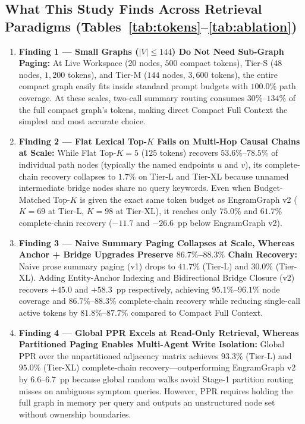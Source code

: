 \documentclass[10pt]{article}
\begin{document}
\subsection{What This Study Finds Across Retrieval Paradigms (Tables~\ref{tab:tokens}--\ref{tab:ablation})}
\begin{enumerate}
  \setlength{\itemsep}{2pt}\setlength{\parskip}{0pt}
  \item \textbf{Finding 1 --- Small Graphs ($|V| \le 144$) Do Not Need Sub-Graph Paging:} At Live Workspace ($20$ nodes, $500$ compact tokens), Tier-S ($48$ nodes, $1,200$ tokens), and Tier-M ($144$ nodes, $3,600$ tokens), the entire compact graph easily fits inside standard prompt budgets with $100.0\%$ path coverage. At these scales, two-call summary routing consumes $30\%$--$134\%$ of the full compact graph's tokens, making direct Compact Full Context the simplest and most accurate choice.
  \item \textbf{Finding 2 --- Flat Lexical Top-$K$ Fails on Multi-Hop Causal Chains at Scale:} While Flat Top-$K=5$ ($125$ tokens) recovers $53.6\%$--$78.5\%$ of individual path nodes (typically the named endpoints $u$ and $v$), its complete-chain recovery collapses to $1.7\%$ on Tier-L and Tier-XL because unnamed intermediate bridge nodes share no query keywords. Even when Budget-Matched Top-$K$ is given the exact same token budget as EngramGraph v2 ($K=69$ at Tier-L, $K=98$ at Tier-XL), it reaches only $75.0\%$ and $61.7\%$ complete-chain recovery ($-11.7$ and $-26.6$~pp below EngramGraph v2).
  \item \textbf{Finding 3 --- Naive Summary Paging Collapses at Scale, Whereas Anchor + Bridge Upgrades Preserve $86.7\%$--$88.3\%$ Chain Recovery:} Naive prose summary paging (v1) drops to $41.7\%$ (Tier-L) and $30.0\%$ (Tier-XL). Adding Entity-Anchor Indexing and Bidirectional Bridge Closure (v2) recovers $+45.0$ and $+58.3$~pp respectively, achieving $95.1\%$--$96.1\%$ node coverage and $86.7\%$--$88.3\%$ complete-chain recovery while reducing single-call active tokens by $81.8\%$--$87.7\%$ compared to Compact Full Context.
  \item \textbf{Finding 4 --- Global PPR Excels at Read-Only Retrieval, Whereas Partitioned Paging Enables Multi-Agent Write Isolation:} Global PPR over the unpartitioned adjacency matrix achieves $93.3\%$ (Tier-L) and $95.0\%$ (Tier-XL) complete-chain recovery—outperforming EngramGraph v2 by $6.6$--$6.7$~pp because global random walks avoid Stage-1 partition routing misses on ambiguous symptom queries. However, PPR requires holding the full graph in memory per query and outputs an unstructured node set without ownership boundaries.
\end{enumerate}
\end{document}
